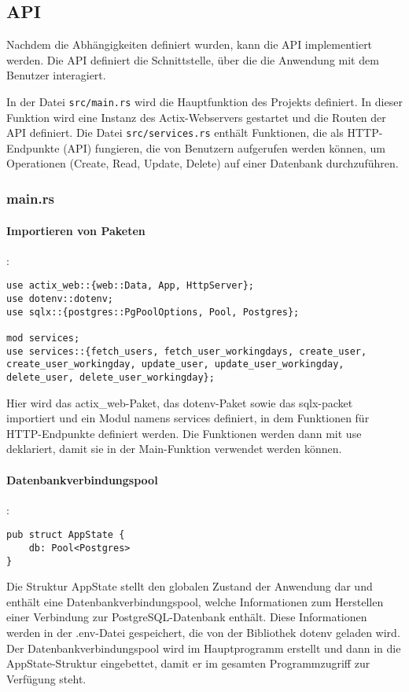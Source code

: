 \subsection{API}
Nachdem die Abhängigkeiten definiert wurden, kann die API implementiert werden. Die API definiert die Schnittstelle, über die die Anwendung mit dem Benutzer interagiert.

In der Datei \texttt{src/main.rs} wird die Hauptfunktion des Projekts definiert. In dieser Funktion wird eine Instanz des Actix-Webservers gestartet und die Routen der API definiert.
Die Datei \texttt{src/services.rs} enthält Funktionen, die als HTTP-Endpunkte (API) fungieren, die von Benutzern aufgerufen werden können, um Operationen (Create, Read, Update, Delete) auf einer Datenbank durchzuführen.

\subsubsection{main.rs}
\paragraph{Importieren von Paketen}:
\begin{verbatim}
use actix_web::{web::Data, App, HttpServer};
use dotenv::dotenv;
use sqlx::{postgres::PgPoolOptions, Pool, Postgres};

mod services;
use services::{fetch_users, fetch_user_workingdays, create_user, create_user_workingday, update_user, update_user_workingday, delete_user, delete_user_workingday};
\end{verbatim}
Hier wird das actix\_web-Paket, das dotenv-Paket sowie das sqlx-packet importiert und ein Modul namens services definiert, in dem Funktionen für HTTP-Endpunkte definiert werden. Die Funktionen werden dann mit use deklariert, damit sie in der Main-Funktion verwendet werden können.

\paragraph{Datenbankverbindungspool}:
\begin{verbatim}
pub struct AppState {
    db: Pool<Postgres>
}
\end{verbatim}
Die Struktur AppState stellt den globalen Zustand der Anwendung dar und enthält eine Datenbankverbindungspool, welche Informationen zum Herstellen einer Verbindung zur PostgreSQL-Datenbank enthält.  Diese Informationen werden in der .env-Datei gespeichert, die von der Bibliothek dotenv geladen wird. Der Datenbankverbindungspool wird im Hauptprogramm erstellt und dann in die AppState-Struktur eingebettet, damit er im gesamten Programmzugriff zur Verfügung steht.
